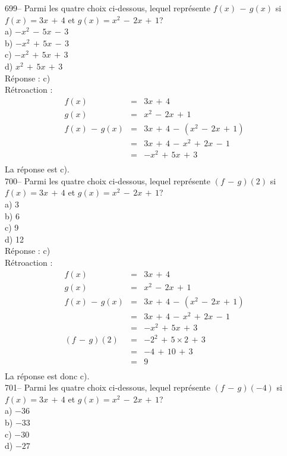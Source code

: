 ﻿\documentclass[letterpaper, 12pt]{article}
\begin{document}
699-- Parmi les quatre choix ci-dessous, lequel repr\'esente $f(x)\,-\,g(x)$
si $f(x)=3x\,+\,4$ et $g(x)=x^{2}\,-\,2x\,+\,1$?\\
a) $-x^{2}\,-\,5x\,-\,3$\\
b) $-x^{2}\,+\,5x\,-\,3$\\
c) $-x^{2}\,+\,5x\,+\,3$\\
d) $x^{2}\,+\,5x\,+\,3$\\

R\'eponse : c)\\

R\'etroaction : \\
\begin{eqnarray*}
f(x)&=&3x\,+\,4\\
g(x)&=&x^{2}\,-\,2x\,+\,1\\
f(x)\,-\,g(x)&=&3x\,+\,4\,-\,(x^{2}\,-\,2x\,+\,1)\\
&=&3x\,+\,4\,-\,x^{2}\,+\,2x\,-\,1\\
&=&-x^{2}\,+\,5x\,+\,3\\
\end{eqnarray*}
La r\'eponse est c).\\

700-- Parmi les quatre choix ci-dessous, lequel repr\'esente $(f\,-\,g)(2)$
si $f(x)=3x\,+\,4$ et $g(x)=x^{2}\,-\,2x\,+\,1$?\\
a) 3\\
b) 6\\
c) 9\\
d) 12\\

R\'eponse : c)\\

R\'etroaction : \\
\begin{eqnarray*}
f(x)&=&3x\,+\,4\\
g(x)&=&x^{2}\,-\,2x\,+\,1\\
f(x)\,-\,g(x)&=&3x\,+\,4\,-\,(x^{2}\,-\,2x\,+\,1)\\
&=&3x\,+\,4\,-\,x^{2}\,+\,2x\,-\,1\\
&=&-x^{2}\,+\,5x\,+\,3\\
(f\,-\,g)(2)&=& - 2^{2}\,+\,5\times2\,+\,3\\
&=&-4\,+\,10\,+\,3\\
&=&9\\
\end{eqnarray*}
La r\'eponse est donc c).\\

701-- Parmi les quatre choix ci-dessous, lequel repr\'esente $(f\,-\,g)(-4)$
si $f(x)=3x\,+\,4$ et $g(x)=x^{2}\,-\,2x\,+\,1$?\\
a) $-36$\\
b) $-33$\\
c) $-30$\\
d) $-27$\\
\end{document}

